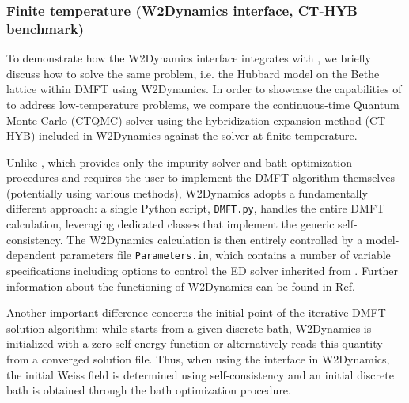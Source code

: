 \documentclass[edipack_sp.tex]{subfiles}
\begin{document}
\subsubsection{Finite temperature (W2Dynamics interface, CT-HYB benchmark)}\label{SecExamplesBetheDMFTW2D}
To demonstrate how the W2Dynamics interface integrates with  \NAME, we briefly discuss how to solve the same problem, i.e. the Hubbard model on the Bethe lattice within DMFT using W2Dynamics. 
In order to showcase the capabilities of \NAME to address low-temperature problems, we compare the continuous-time Quantum Monte Carlo (CTQMC) solver using the hybridization expansion method (CT-HYB) included in W2Dynamics against the \NAME solver at finite temperature.  

Unlike \NAME, which provides only the impurity solver and bath optimization procedures and requires the user to implement the DMFT algorithm themselves (potentially using various methods), W2Dynamics adopts a fundamentally different approach: a single Python script, {\tt DMFT.py}, handles the entire DMFT calculation, leveraging dedicated classes that implement the generic self-consistency. The W2Dynamics calculation is then entirely controlled by a model-dependent parameters file {\tt Parameters.in}, which contains a number of variable specifications including options to control the ED solver inherited from \NAME. Further information about the functioning of W2Dynamics can be found in Ref. \cite{Wallerberger2019CPC}           

Another important difference concerns the initial point of the iterative DMFT solution algorithm: while \NAME starts from a given discrete bath, W2Dynamics is initialized with a zero self-energy function or alternatively reads this quantity from a converged solution file. Thus, when using the \NAME interface in W2Dynamics, the initial Weiss field is determined using self-consistency and  an initial discrete bath is obtained through the \NAME bath optimization procedure. 
\end{document}
